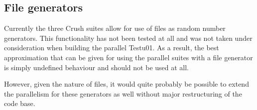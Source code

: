 \subsection{File generators}
Currently the three Crush suites allow for use of files as random number generators. This functionality has not been tested at all and was not taken under consideration when building the parallel Testu01. As a result, the best approximation that can be given for using the parallel suites with a file generator is simply undefined behaviour and should not be used at all.

However, given the nature of files, it would quite probably be possible to extend the parallelism for these generators as well without major restructuring of the code base.
